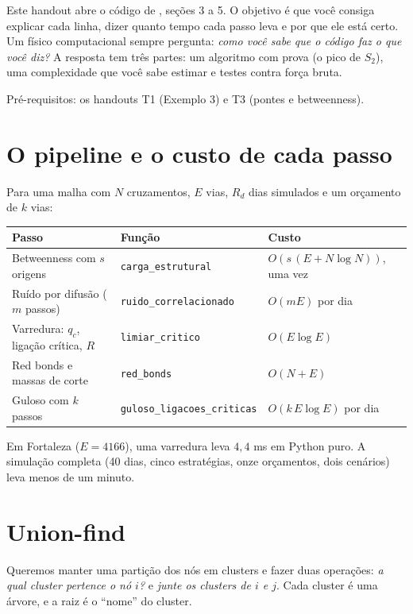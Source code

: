 \documentclass[11pt]{article}
\begin{document}
\fazertitulo

Este handout abre o código de , seções 3 a 5. O objetivo é que você consiga explicar cada linha, dizer quanto tempo cada passo leva e por que ele está certo. Um físico computacional sempre pergunta: \emph{como você sabe que o código faz o que você diz?} A resposta tem três partes: um algoritmo com prova (o pico de $S_2$), uma complexidade que você sabe estimar e testes contra força bruta.

Pré-requisitos: os handouts T1 (Exemplo 3) e T3 (pontes e betweenness). 

\section{O pipeline e o custo de cada passo}

Para uma malha com $N$ cruzamentos, $E$ vias, $R_d$ dias simulados e um orçamento de $k$ vias:
\begin{center}\small
\renewcommand{\arraystretch}{1.15}
\begin{tabular}{lll}
\toprule
Passo & Função & Custo\\
\midrule
Betweenness com $s$ origens & \texttt{carga\_estrutural} & $O(s\,(E+N\log N))$, uma vez\\
Ruído por difusão ($m$ passos) & \texttt{ruido\_correlacionado} & $O(mE)$ por dia\\
Varredura: $q_c$, ligação crítica, $R$ & \texttt{limiar\_critico} & $O(E\log E)$\\
Red bonds e massas de corte & \texttt{red\_bonds} & $O(N+E)$\\
Guloso com $k$ passos & \texttt{guloso\_ligacoes\_criticas} & $O(k\,E\log E)$ por dia\\
\bottomrule
\end{tabular}
\end{center}
Em Fortaleza ($E=4166$), uma varredura leva $4{,}4$ ms em Python puro. A simulação completa (40 dias, cinco estratégias, onze orçamentos, dois cenários) leva menos de um minuto.

\section{Union-find}

Queremos manter uma partição dos nós em clusters e fazer duas operações: \emph{a qual cluster pertence o nó $i$?} e \emph{junte os clusters de $i$ e $j$}. Cada cluster é uma árvore, e a raiz é o ``nome'' do cluster.
\end{document}
